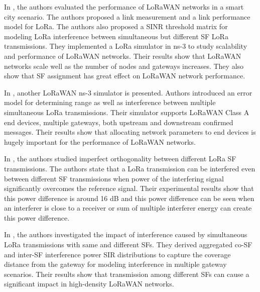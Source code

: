 \documentclass[conference]{IEEEtran}
\begin{document}
\par In \cite{7996384}, the authors evaluated the performance of LoRaWAN networks in a smart city scenario. The authors proposed a link measurement and a link performance model for LoRa. The authors also proposed a SINR threshold matrix for modeling LoRa interference between simultaneous but different SF LoRa transmissions. They implemented a LoRa simulator in ns-3 to study scalability and performance of LoRaWAN networks. Their results show that LoRaWAN networks scale well as the number of nodes and gateways increases. They also show that SF assignment has great effect on LoRaWAN network performance.

\par In \cite{8090518}, another LoRaWAN ns-3 simulator is presented. Authors introduced an error model for determining range as well as interference between multiple simultaneous LoRa transmissions. Their simulator supports LoRaWAN Class A end devices, multiple gateways, both upstream and downstream confirmed messages. Their results show that allocating network parameters to end devices is hugely important for the performance of LoRaWAN networks.

\par In \cite{8267219}, the authors studied imperfect orthogonality between different LoRa SF transmissions. The authors state that a LoRa transmission can be interfered even between different SF transmissions when power of the interfering signal significantly overcomes the reference signal. Their experimental results show that this power difference is around 16 dB and this power difference can be seen when an interferer is close to a receiver or sum of multiple interferer energy can create this power difference.

\par In \cite{8430542}, the authors investigated the impact of interference caused by simultaneous LoRa transmissions with same and different SFs. They derived aggregated co-SF and inter-SF interference power SIR distributions to capture the coverage distance from the gateway for modeling interference in multiple gateway scenarios. Their results show that transmission among different SFs can cause a significant impact in high-density LoRaWAN networks.
\end{document}
